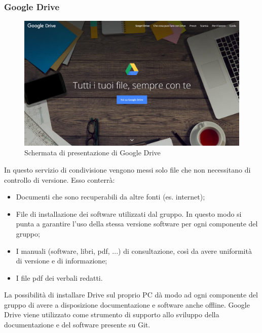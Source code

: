 \documentclass[../NormeDiProgetto.tex]{subfiles}
\begin{document}
			\subsubsection{Google Drive}
			\begin{figure} [h!]
				\centering
				\includegraphics[scale=0.2]{./Immagini/Drive.png}
				\caption{Schermata di presentazione di Google Drive}\label{}
			\end{figure}
				In questo servizio di condivisione vengono messi solo file che non necessitano di
				controllo di versione.
				Esso conterrà:
				\begin{itemize}
					\item Documenti che sono recuperabili da altre fonti (es. internet);
					\item File di installazione dei software utilizzati dal gruppo.
					In questo modo si punta a garantire l'uso della stessa versione software per ogni
					componente del gruppo;
					\item I manuali (software, libri, pdf, ...) di consultazione, così da avere
					uniformità di versione e di informazione;
					\item I file pdf dei verbali redatti.
				\end{itemize}
				La possibilità di installare Drive sul proprio PC dà modo ad ogni componente del gruppo di
				avere a disposizione documentazione e software anche offline.
				Google Drive viene utilizzato come strumento di supporto allo sviluppo della
				documentazione e del software presente su Git.
\end{document}
